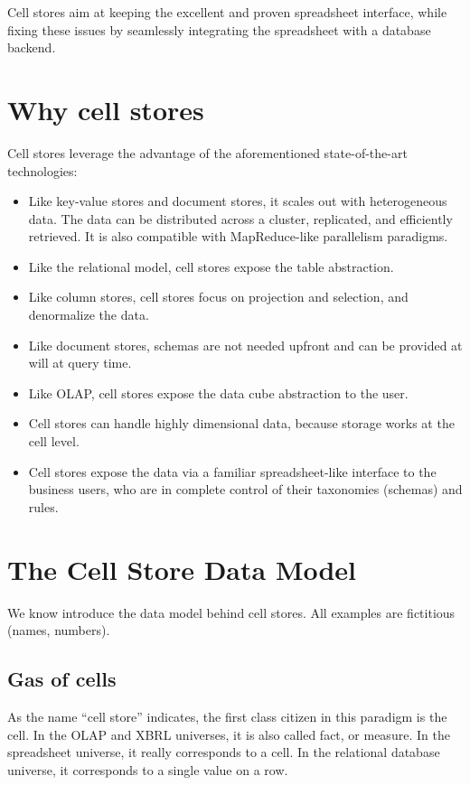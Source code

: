 \documentclass{acm_proc_article-sp}
\begin{document}
Cell stores aim at keeping the excellent and proven spreadsheet interface, while fixing these issues by seamlessly integrating the spreadsheet with a database backend.

\section{Why cell stores}
\label{section-why}

Cell stores leverage the advantage of the aforementioned state-of-the-art technologies:

\begin{itemize}
\item Like key-value stores and document stores, it scales out with heterogeneous data. The data can be distributed across a cluster, replicated, and efficiently retrieved. It is also compatible with MapReduce-like parallelism paradigms.
\item Like the relational model, cell stores expose the table abstraction.
\item Like column stores, cell stores focus on projection and selection, and denormalize the data. 
\item Like document stores, schemas are not needed upfront and can be provided at will at query time.
\item Like OLAP, cell stores expose the data cube abstraction to the user.
\item Cell stores can handle highly dimensional data, because storage works at the cell level.
\item Cell stores expose the data via a familiar spreadsheet-like interface to the business users, who are in complete control of their taxonomies (schemas) and rules.
\end{itemize}

\section{The Cell Store Data Model}
\label{section-data-model}

We know introduce the data model behind cell stores. All examples are fictitious (names, numbers).

\subsection{Gas of cells}

As the name ``cell store'' indicates, the first class citizen in this paradigm is the cell. In the OLAP and XBRL \cite{XBRL} universes, it is also called fact, or measure. In the spreadsheet universe, it really corresponds to a cell. In the relational database universe, it corresponds to a single value on a row.
\end{document}
